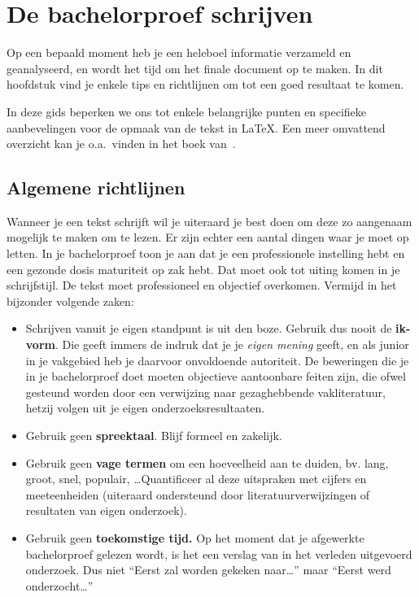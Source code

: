 \chapter{De bachelorproef schrijven}
\label{ch:schrijven}

Op een bepaald moment heb je een heleboel informatie verzameld en geanalyseerd, en wordt het tijd om het finale document op te maken. In dit hoofdstuk vind je enkele tips en richtlijnen om tot een goed resultaat te komen.

In deze gids beperken we ons tot enkele belangrijke punten en specifieke aanbevelingen voor de opmaak van de tekst in {\LaTeX}. Een meer omvattend overzicht kan je o.a.~vinden in het boek van~\textcite{Pollefliet2011}.

\section{Algemene richtlijnen}
\label{ch:algemene-richtlijnen}

Wanneer je een tekst schrijft wil je uiteraard je best doen om deze zo aangenaam mogelijk te maken om te lezen. Er zijn echter een aantal dingen waar je moet op letten. In je bachelorproef toon je aan dat je een professionele instelling hebt en een gezonde dosis maturiteit op zak hebt. Dat moet ook tot uiting komen in je schrijfstijl. De tekst moet professioneel en objectief overkomen. Vermijd in het bijzonder volgende zaken:

\begin{itemize}
  \item Schrijven vanuit je eigen standpunt is uit den boze. Gebruik dus nooit de \textbf{ik-vorm}. Die geeft immers de indruk dat je je \emph{eigen mening} geeft, en als junior in je vakgebied heb je daarvoor onvoldoende autoriteit. De beweringen die je in je bachelorproef doet moeten objectieve aantoonbare feiten zijn, die ofwel gesteund worden door een verwijzing naar gezaghebbende vakliteratuur, hetzij volgen uit je eigen onderzoeksresultaaten.
  \item Gebruik geen \textbf{spreektaal}. Blijf formeel en zakelijk.
  \item Gebruik geen \textbf{vage termen} om een hoeveelheid aan te duiden, bv. lang, groot, snel, populair, \ldots Quantificeer al deze uitspraken met cijfers en meeteenheiden (uiteraard ondersteund door literatuurverwijzingen of resultaten van eigen onderzoek).
  \item Gebruik geen \textbf{toekomstige tijd.} Op het moment dat je afgewerkte bachelorproef gelezen wordt, is het een verslag van in het verleden uitgevoerd onderzoek. Dus niet ``Eerst zal worden gekeken naar\ldots'' maar ``Eerst werd onderzocht\ldots''
\end{itemize}

